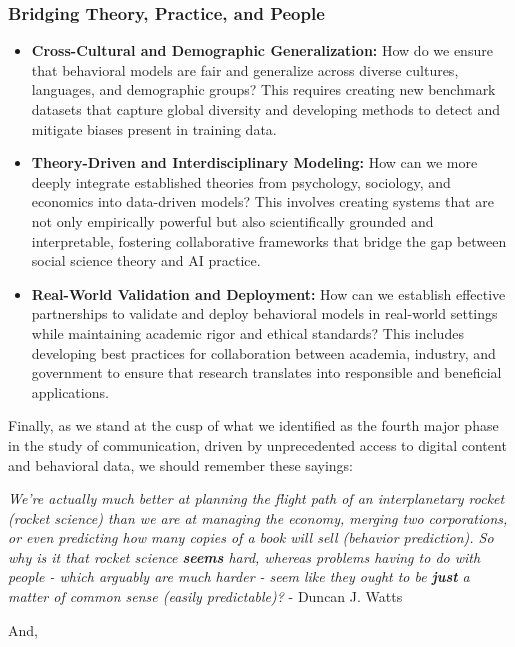 \subsubsection*{Bridging Theory, Practice, and People}
\begin{itemize}
    \item \textbf{Cross-Cultural and Demographic Generalization:} How do we ensure that behavioral models are fair and generalize across diverse cultures, languages, and demographic groups? This requires creating new benchmark datasets that capture global diversity and developing methods to detect and mitigate biases present in training data.
    
    \item \textbf{Theory-Driven and Interdisciplinary Modeling:} How can we more deeply integrate established theories from psychology, sociology, and economics into data-driven models? This involves creating systems that are not only empirically powerful but also scientifically grounded and interpretable, fostering collaborative frameworks that bridge the gap between social science theory and AI practice.
    
    \item \textbf{Real-World Validation and Deployment:} How can we establish effective partnerships to validate and deploy behavioral models in real-world settings while maintaining academic rigor and ethical standards? This includes developing best practices for collaboration between academia, industry, and government to ensure that research translates into responsible and beneficial applications.
\end{itemize}



Finally, as we stand at the cusp of what we identified as the fourth major phase in the study of communication, driven by unprecedented access to digital content and behavioral data, we should remember these sayings:

\textit{We're actually much better at planning the flight path of an interplanetary rocket (rocket science) than we are at managing the economy, merging two corporations, or even predicting how many copies of a book will sell (behavior prediction). So why is it that rocket science \textbf{seems} hard, whereas problems having to do with people - which arguably are much harder - seem like they ought to be \textbf{just} a matter of common sense (easily predictable)?} - Duncan J. Watts       

\begin{center}
    And,
\end{center}

